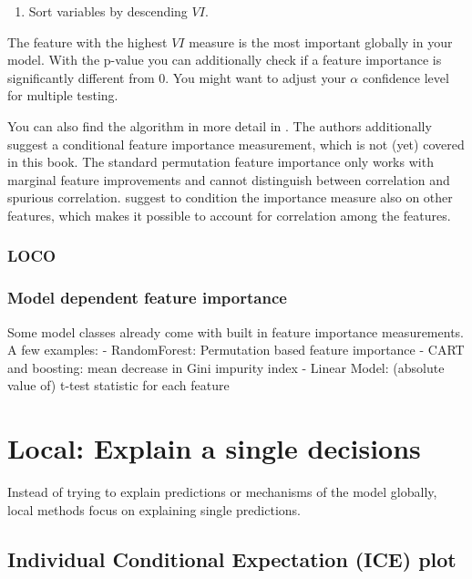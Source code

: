 \documentclass[12pt,]{krantz}
\providecommand{\tightlist}{%
  \setlength{\itemsep}{0pt}\setlength{\parskip}{0pt}}
\theoremstyle{definition}
\theoremstyle{definition}
\theoremstyle{definition}
\theoremstyle{remark}
\begin{document}
\begin{enumerate}
\def\labelenumi{\arabic{enumi}.}
\setcounter{enumi}{2}
\tightlist
\item
  Sort variables by descending \(VI\).
\end{enumerate}

The feature with the highest \(VI\) measure is the most important
globally in your model. With the p-value you can additionally check if a
feature importance is significantly different from 0. You might want to
adjust your \(\alpha\) confidence level for multiple testing.

You can also find the algorithm in more detail in \citep{Strobl2008}.
The authors additionally suggest a conditional feature importance
measurement, which is not (yet) covered in this book. The standard
permutation feature importance only works with marginal feature
improvements and cannot distinguish between correlation and spurious
correlation. \citep{Strobl2008} suggest to condition the importance
measure also on other features, which makes it possible to account for
correlation among the features.

\subsubsection{LOCO}\label{loco}

\subsubsection{Model dependent feature
importance}\label{model-dependent-feature-importance}

Some model classes already come with built in feature importance
measurements. A few examples: - RandomForest: Permutation based feature
importance - CART and boosting: mean decrease in Gini impurity index -
Linear Model: (absolute value of) t-test statistic for each feature

\section{Local: Explain a single
decisions}\label{local-explain-a-single-decisions}

Instead of trying to explain predictions or mechanisms of the model
globally, local methods focus on explaining single predictions.

\subsection{Individual Conditional Expectation (ICE)
plot}\label{individual-conditional-expectation-ice-plot}
\end{document}
